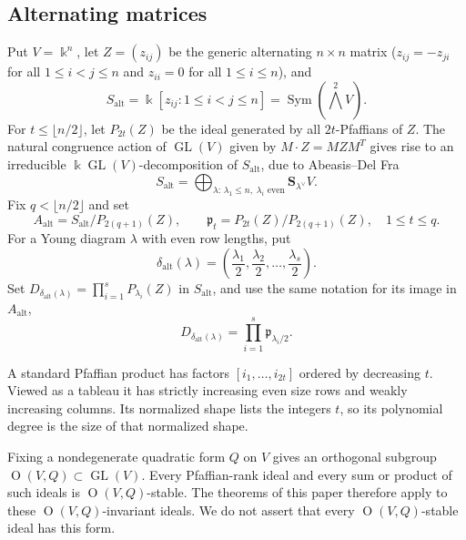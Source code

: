\documentclass[11pt,reqno]{amsart}
\numberwithin{equation}{subsection}
\theoremstyle{definition}
\theoremstyle{remark}
\DeclareMathOperator{\GL}{GL}
\DeclareMathOperator{\Orth}{O}
\DeclareMathOperator{\Sym}{Sym}
\newcommand{\kfield}{\Bbbk}
\newcommand{\fp}{\mathfrak p}
\newcommand{\Schur}{\mathbf S}
\begin{document}
\subsection{Alternating matrices}

Put $V=\kfield^{n}$, let $Z=(z_{ij})$ be the generic alternating $n\times n$ matrix ($z_{ij}=-z_{ji}$ for all $1\leq i< j\leq n$ and $z_{ii}=0$ for all $1\leq i\leq n$), and 
\[
 S_{\mathrm{alt}}=\kfield[z_{ij}:1\le i<j\le n]
 =\Sym(\textstyle\bigwedge^2V).
\]
For $t\le\lfloor n/2\rfloor$, let $P_{2t}(Z)$ be the ideal generated by
all $2t$-Pfaffians of $Z$.  The natural congruence action of $\GL(V)$ given by $M\cdot Z=MZM^T$ gives rise to an  irreducible $\kfield\GL(V)$-decomposition of $S_{\mathrm{alt}}$, due to Abeasis--Del Fra~\cite[Theorem 2.5]{AbeasisDelFra}
\begin{equation}\label{eq:alternating-decomp}
 S_{\mathrm{alt}}
 =\bigoplus_{\lambda:\,\lambda_1 \le n,\;
                  \lambda_i\text{ even}}
 \Schur_{\lambda^\vee} V.
\end{equation}
Fix $q<\lfloor n/2\rfloor$ and set
\begin{equation}\label{eq:alternating-quotient}
 A_{\mathrm{alt}}=S_{\mathrm{alt}}/P_{2(q+1)}(Z),
 \qquad
 \fp_t=P_{2t}(Z)/P_{2(q+1)}(Z),\quad1\le t\le q.
\end{equation}
For a Young diagram $\lambda$ with even row lengths, put
\begin{equation}\label{eq:alt-transform}
 \delta_{\mathrm{alt}}(\lambda)
 =\left(\frac{\lambda_1}{2},
        \frac{\lambda_2}{2},\ldots, \frac{\lambda_s}{2} \right).
\end{equation}
Set
$
D_{\delta_{\mathrm{alt}}(\lambda)}
   =\prod_{i=1}^{s}P_{\lambda_i}(Z)
$
in $S_{\mathrm{alt}}$, and use the same notation for its image in $A_{\mathrm{alt}}$,
\[D_{\delta_{\mathrm{alt}}(\lambda)}=\prod_{i=1}^{s}\fp_{\lambda_i/2}.\]

A standard Pfaffian product has factors
$[i_1,\ldots,i_{2t}]$ ordered by decreasing $t$. Viewed as a tableau it has strictly increasing even size rows and weakly increasing columns. Its normalized shape lists the integers $t$, so its polynomial degree is the size of
that normalized shape.

Fixing a nondegenerate quadratic form $Q$ on $V$ gives an orthogonal
subgroup $\Orth(V,Q)\subset\GL(V)$.  Every Pfaffian-rank ideal and every
sum or product of such ideals is $\Orth(V,Q)$-stable.  The theorems of
this paper therefore apply to these $\Orth(V,Q)$-invariant ideals.  We
do not assert that every $\Orth(V,Q)$-stable ideal has this form.
\end{document}
